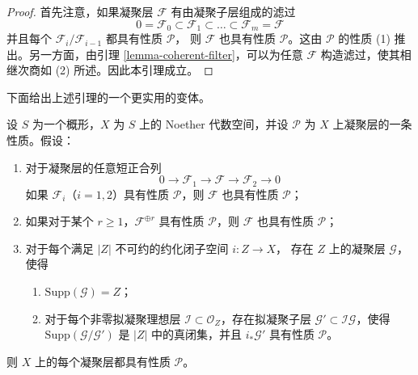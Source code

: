 \begin{proof}
首先注意，如果凝聚层 $\mathcal{F}$ 有由凝聚子层组成的滤过
$$
0 = \mathcal{F}_0 \subset \mathcal{F}_1 \subset
\ldots \subset \mathcal{F}_m = \mathcal{F}
$$
并且每个 $\mathcal{F}_i/\mathcal{F}_{i - 1}$ 都具有性质 $\mathcal{P}$，
则 $\mathcal{F}$ 也具有性质 $\mathcal{P}$。这由 $\mathcal{P}$ 的性质 (1)
推出。另一方面，由引理 \ref{lemma-coherent-filter}，可以为任意
$\mathcal{F}$ 构造滤过，使其相继次商如 (2) 所述。因此本引理成立。
\end{proof}

\noindent
下面给出上述引理的一个更实用的变体。

\begin{lemma}
\label{lemma-property-higher-rank-cohomological}
设 $S$ 为一个概形，$X$ 为 $S$ 上的 Noether 代数空间，并设
$\mathcal{P}$ 为 $X$ 上凝聚层的一条性质。假设：
\begin{enumerate}
\item 对于凝聚层的任意短正合列
$$
0 \to \mathcal{F}_1 \to \mathcal{F} \to \mathcal{F}_2 \to 0
$$
如果 $\mathcal{F}_i$（$i = 1, 2$）具有性质 $\mathcal{P}$，则
$\mathcal{F}$ 也具有性质 $\mathcal{P}$；
\item 如果对于某个 $r \geq 1$，$\mathcal{F}^{\oplus r}$ 具有性质
$\mathcal{P}$，则 $\mathcal{F}$ 也具有性质 $\mathcal{P}$；
\item 对于每个满足 $|Z|$ 不可约的约化闭子空间 $i : Z \to X$，
存在 $Z$ 上的凝聚层 $\mathcal{G}$，使得
\begin{enumerate}
\item $\text{Supp}(\mathcal{G}) = Z$；
\item 对于每个非零拟凝聚理想层
$\mathcal{I} \subset \mathcal{O}_Z$，存在拟凝聚子层
$\mathcal{G}' \subset \mathcal{I}\mathcal{G}$，使得
$\text{Supp}(\mathcal{G}/\mathcal{G}')$ 是 $|Z|$ 中的真闭集，并且
$i_*\mathcal{G}'$ 具有性质 $\mathcal{P}$。
\end{enumerate}
\end{enumerate}
则 $X$ 上的每个凝聚层都具有性质 $\mathcal{P}$。
\end{lemma}

